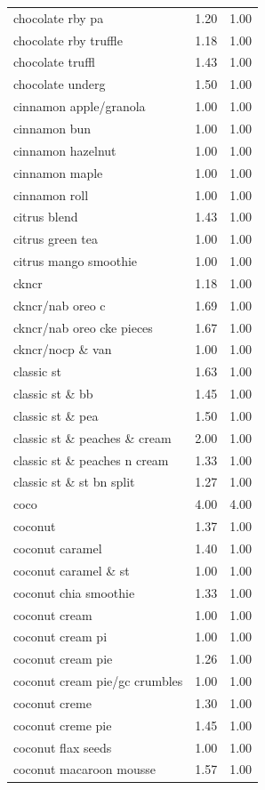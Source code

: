 \begin{table}
\begin{tabular}{lrr}
chocolate rby pa & 1.20 & 1.00 \\
chocolate rby truffle & 1.18 & 1.00 \\
chocolate truffl & 1.43 & 1.00 \\
chocolate underg & 1.50 & 1.00 \\
cinnamon apple/granola & 1.00 & 1.00 \\
cinnamon bun & 1.00 & 1.00 \\
cinnamon hazelnut & 1.00 & 1.00 \\
cinnamon maple & 1.00 & 1.00 \\
cinnamon roll & 1.00 & 1.00 \\
citrus blend & 1.43 & 1.00 \\
citrus green tea & 1.00 & 1.00 \\
citrus mango smoothie & 1.00 & 1.00 \\
ckncr & 1.18 & 1.00 \\
ckncr/nab oreo c & 1.69 & 1.00 \\
ckncr/nab oreo cke pieces & 1.67 & 1.00 \\
ckncr/nocp \& van & 1.00 & 1.00 \\
classic st & 1.63 & 1.00 \\
classic st \& bb & 1.45 & 1.00 \\
classic st \& pea & 1.50 & 1.00 \\
classic st \& peaches \& cream & 2.00 & 1.00 \\
classic st \& peaches n cream & 1.33 & 1.00 \\
classic st \& st bn split & 1.27 & 1.00 \\
coco & 4.00 & 4.00 \\
coconut & 1.37 & 1.00 \\
coconut caramel & 1.40 & 1.00 \\
coconut caramel \& st & 1.00 & 1.00 \\
coconut chia smoothie & 1.33 & 1.00 \\
coconut cream & 1.00 & 1.00 \\
coconut cream pi & 1.00 & 1.00 \\
coconut cream pie & 1.26 & 1.00 \\
coconut cream pie/gc crumbles & 1.00 & 1.00 \\
coconut creme & 1.30 & 1.00 \\
coconut creme pie & 1.45 & 1.00 \\
coconut flax seeds & 1.00 & 1.00 \\
coconut macaroon mousse & 1.57 & 1.00 \\

\end{tabular}
\end{table}
